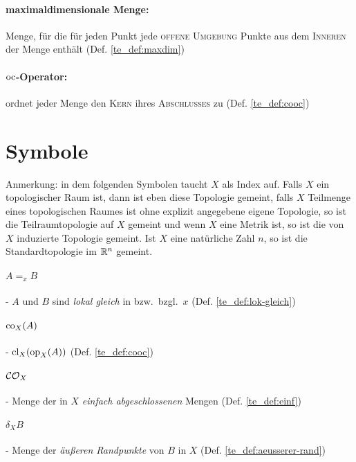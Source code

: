     \paragraph{maximaldimensionale Menge:} Menge, für die für jeden Punkt jede \textsc{offene Umgebung} Punkte aus dem \textsc{Inneren} der Menge enthält  (Def. \ref{te_def:maxdim})
    
    \paragraph{$\text{oc}$-Operator:} ordnet jeder Menge den \textsc{Kern} ihres \textsc{Abschlusses} zu (Def. \ref{te_def:cooc})
    
   
\section*{Symbole}

    Anmerkung: in dem folgenden Symbolen taucht $X$ als Index auf. Falls $X$ ein topologischer Raum ist, dann ist eben diese Topologie gemeint, falls $X$ Teilmenge eines topologischen Raumes ist ohne explizit angegebene eigene Topologie, so ist die Teilraumtopologie auf $X$ gemeint und wenn $X$ eine Metrik ist, so ist die von $X$ induzierte Topologie gemeint. Ist $X$ eine natürliche Zahl $n$, so ist die Standardtopologie im $\mathbb{R}^n$ gemeint.

    \paragraph{$A =_x B$} - \quad $A$ und $B$ sind \textit{lokal gleich} in bzw.\ bzgl.\ $x$  (Def. \ref{te_def:lok-gleich})

    \paragraph{$\text{co}_X(A)$} - \quad $\text{cl}_X(\text{op}_X(A))$ (Def. \ref{te_def:cooc})

    \paragraph{$\mathcal{CO}_X$} - \quad Menge der in $X$ \textit{einfach abgeschlossenen} Mengen (Def. \ref{te_def:einf})

    \paragraph{$\delta_X B$} - \quad Menge der \textit{äußeren Randpunkte} von $B$ in $X$ (Def. \ref{te_def:aeusserer-rand})
    
